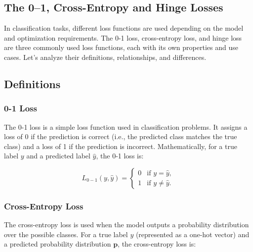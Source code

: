 \begin{notechapter}
\lstset{style=mystyle}
\chapter{The 0--1, Cross-Entropy and Hinge Losses}\label{ch:zero-one-vs-ce}

In classification tasks, different loss functions are used depending on 
the model and optimization requirements. The 0-1 loss, cross-entropy 
loss, and hinge loss are three commonly used loss functions, each with 
its own properties and use cases. Let's analyze their definitions, 
relationships, and differences.

\section{Definitions}

\subsection{0-1 Loss}
The 0-1 loss is a simple loss function used in classification problems. 
It assigns a loss of 0 if the prediction is correct (i.e., the predicted 
class matches the true class) and a loss of 1 if the prediction is 
incorrect. Mathematically, for a true label \( y \) and a predicted 
label \( \hat{y} \), the 0-1 loss is:

\[
L_{0-1}(y, \hat{y}) = 
\begin{cases} 
0 & \text{if } y = \hat{y}, \\
1 & \text{if } y \neq \hat{y}.
\end{cases}
\]

\subsection{Cross-Entropy Loss}
The cross-entropy loss is used when the model outputs a probability 
distribution over the possible classes. For a true label \( y \) 
(represented as a one-hot vector) and a predicted probability 
distribution \( \mathbf{p} \), the cross-entropy loss is:


\end{notechapter}
